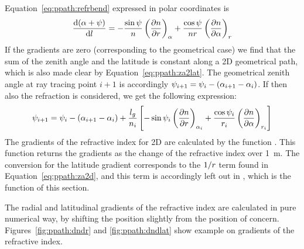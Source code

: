 Equation~\ref{eq:ppath:refrbend} expressed in polar coordinates
is \citep[Eq. 9.30]{rodgers:00}
\begin{equation}
  \frac{\mathrm{d}(\alpha+\psi)}{\mathrm{d} l} = 
    -\frac{\sin\psi}{n} \left( \frac{\partial n}{\partial r} \right)_{\alpha}
    +\frac{\cos\psi}{nr} \left( \frac{\partial n}{\partial \alpha} \right)_{r}
  \label{eq:ppath:refrbend2d}
\end{equation}
If the gradients are zero (corresponding to the geometrical case) we
find that the sum of the zenith angle and the latitude is constant
along a 2D geometrical path, which is also made clear by
Equation~\ref{eq:ppath:za2lat}. The geometrical zenith angle at ray
tracing point $i+1$ is accordingly $\psi_{i+1} = \psi_{i} -
(\alpha_{i+1}-\alpha_{i})$. If then also the refraction is considered, we
get the following expression:
\begin{equation}
  \psi_{i+1} = \psi_{i} - (\alpha_{i+1}-\alpha_{i}) + \frac{l_g}{n_i}
   \left[
    -\sin\psi_{i} \left( \frac{\partial n}{\partial r} \right)_{\alpha_{i}}
    +\frac{\cos\psi_{i}}{r_{i}} 
                \left( \frac{\partial n}{\partial \alpha} \right)_{r_{i}}
  \right]  
  \label{eq:ppath:za2d}
\end{equation}
The gradients of the refractive index for 2D are calculated by the
function . This function returns the
gradients as the change of the refractive index over 1~m. The
conversion for the latitude gradient corresponds to the $1/r$ term
found in Equation~\ref{eq:ppath:za2d}, and this term is accordingly
left out in , which is the
function of this section. 

The radial and latitudinal gradients of the refractive index are
calculated in pure numerical way, by shifting the position slightly
from the position of concern. Figures~\ref{fig:ppath:dndr} and
\ref{fig:ppath:dndlat} show example on gradients of the refractive
index.




